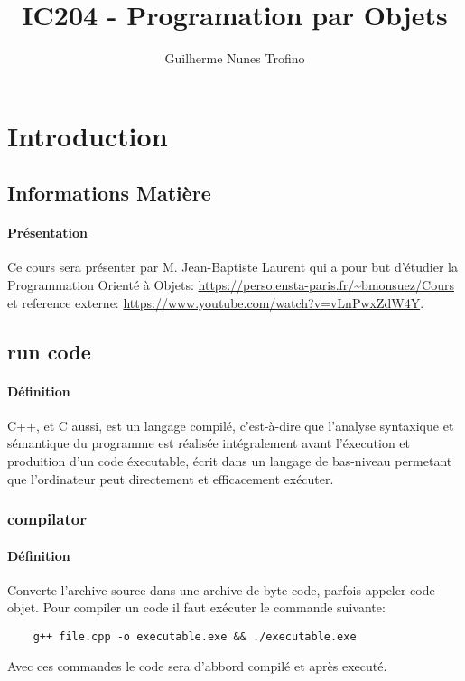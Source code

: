 \documentclass{article}
\title{IC204 - Programation par Objets}
\author{Guilherme Nunes Trofino}
\begin{document}
\maketitle

\newpage\tableofcontents

\section{Introduction}

% 
% 


\subsection{Informations Matière}
\paragraph{Présentation}Ce cours sera présenter par M. Jean-Baptiste Laurent qui a pour but d'étudier la Programmation Orienté à Objets: \url{https://perso.ensta-paris.fr/~bmonsuez/Cours} et reference externe: \url{https://www.youtube.com/watch?v=vLnPwxZdW4Y}.

\subsection{run code}
\paragraph{Définition}C++, et C aussi, est un langage compilé, c'est-à-dire que l'analyse syntaxique et sémantique du programme est réalisée intégralement avant l'éxecution et produition d'un code éxecutable, écrit dans un langage de bas-niveau permetant que l'ordinateur peut directement et efficacement exécuter.\\

\subsubsection{compilator}
\paragraph{Définition}Converte l'archive source dans une archive de byte code, parfois appeler code objet. Pour compiler un code il faut exécuter le commande suivante:
\begin{scriptsize}
    \mycode
    \begin{lstlisting}
    g++ file.cpp -o executable.exe && ./executable.exe
    \end{lstlisting}
\end{scriptsize}
Avec ces commandes le code sera d'abbord compilé et après executé.
\end{document}
